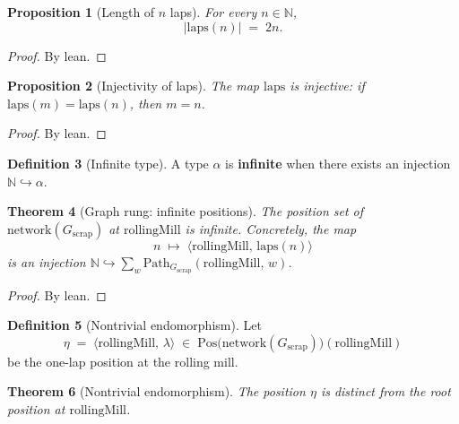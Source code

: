 \documentclass[11pt,a4paper]{article}
\theoremstyle{plain}
\newtheorem{theorem}{Theorem}[section]
\newtheorem{proposition}[theorem]{Proposition}
\theoremstyle{definition}
\newtheorem{definition}[theorem]{Definition}
\newcommand{\Pos}{\mathrm{Pos}}
\newcommand{\N}{\mathbb{N}}
\begin{document}
\begin{proposition}[Length of $n$ laps]\label{prop:laps-len}
For every $n \in \N$,
\[
  \lvert\mathrm{laps}(n)\rvert \;=\; 2n.
\]
\end{proposition}

\begin{proof}
By lean.
\end{proof}

\begin{proposition}[Injectivity of laps]\label{prop:laps-inj}
The map $\mathrm{laps}$ is injective: if $\mathrm{laps}(m) = \mathrm{laps}(n)$,
then $m = n$.
\end{proposition}

\begin{proof}
By lean.
\end{proof}

\begin{definition}[Infinite type]\label{def:infinite}
A type $\alpha$ is \textbf{infinite} when there exists an injection
$\N \hookrightarrow \alpha$.
\end{definition}

\begin{theorem}[Graph rung: infinite positions]\label{thm:graph-rung}
The position set of $\mathrm{network}(G_{\mathrm{scrap}})$ at
$\mathrm{rollingMill}$ is infinite. Concretely, the map
\begin{equation}
  n \;\longmapsto\;
  \bigl\langle \mathrm{rollingMill},\, \mathrm{laps}(n) \bigr\rangle
\end{equation}
is an injection
$\N \hookrightarrow
\sum_w \mathrm{Path}_{G_{\mathrm{scrap}}}(\mathrm{rollingMill},\, w)$.
\end{theorem}

\begin{proof}
By lean.
\end{proof}

\begin{definition}[Nontrivial endomorphism]\label{def:nontrivial-endo}
Let
\begin{equation}
  \eta
  \;=\;
  \bigl\langle \mathrm{rollingMill},\, \lambda \bigr\rangle
  \;\in\;
  \Pos\bigl(\mathrm{network}(G_{\mathrm{scrap}})\bigr)
    (\mathrm{rollingMill})
\end{equation}
be the one-lap position at the rolling mill.
\end{definition}

\begin{theorem}[Nontrivial endomorphism]\label{thm:nontrivial-endo}
The position $\eta$ is distinct from the root position at
$\mathrm{rollingMill}$.
\end{theorem}
\end{document}
